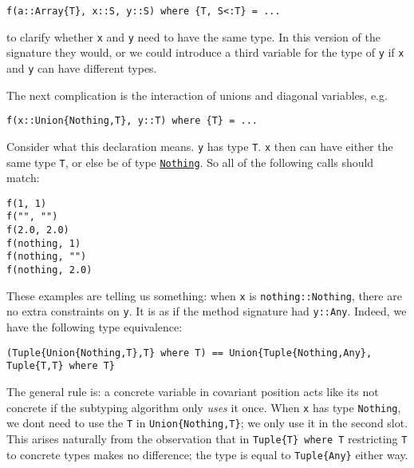 \begin{verbatim}
f(a::Array{T}, x::S, y::S) where {T, S<:T} = ...
\end{verbatim}



to clarify whether \texttt{x} and \texttt{y} need to have the same type. In this version of the signature they would, or we could introduce a third variable for the type of \texttt{y} if \texttt{x} and \texttt{y} can have different types.



The next complication is the interaction of unions and diagonal variables, e.g.




\begin{verbatim}
f(x::Union{Nothing,T}, y::T) where {T} = ...
\end{verbatim}



Consider what this declaration means. \texttt{y} has type \texttt{T}. \texttt{x} then can have either the same type \texttt{T}, or else be of type \hyperlink{13508459519898889544}{\texttt{Nothing}}. So all of the following calls should match:




\begin{verbatim}
f(1, 1)
f("", "")
f(2.0, 2.0)
f(nothing, 1)
f(nothing, "")
f(nothing, 2.0)
\end{verbatim}



These examples are telling us something: when \texttt{x} is \texttt{nothing::Nothing}, there are no extra constraints on \texttt{y}. It is as if the method signature had \texttt{y::Any}. Indeed, we have the following type equivalence:




\begin{verbatim}
(Tuple{Union{Nothing,T},T} where T) == Union{Tuple{Nothing,Any}, Tuple{T,T} where T}
\end{verbatim}



The general rule is: a concrete variable in covariant position acts like it{\textquotesingle}s not concrete if the subtyping algorithm only \emph{uses} it once. When \texttt{x} has type \texttt{Nothing}, we don{\textquotesingle}t need to use the \texttt{T} in \texttt{Union\{Nothing,T\}}; we only use it in the second slot. This arises naturally from the observation that in \texttt{Tuple\{T\} where T} restricting \texttt{T} to concrete types makes no difference; the type is equal to \texttt{Tuple\{Any\}} either way.




